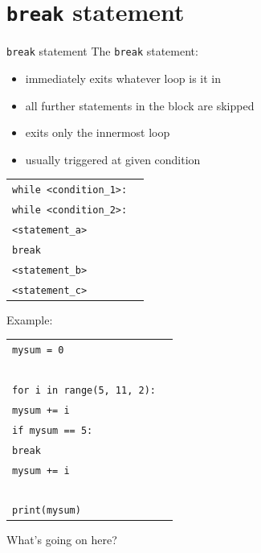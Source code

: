 \documentclass[t,handout,9pt]{beamer}
\begin{document}
\section{\texttt{break} statement}
\begin{frame}{\texttt{break} statement}
\vfill
The \texttt{break} statement:
\begin{itemize}
	\item immediately exits whatever loop is it in
	\item all further statements in the block are skipped
	\item exits only the innermost loop
	\item usually triggered at given condition
\end{itemize}
\vfill
\begin{table}[]
\begin{flushleft}
\begin{tabular}{ll}
\texttt{while <condition\_1>:} &  \\
\texttt{\qquad while <condition\_2>:} &  \\
\texttt{\qquad\qquad <statement\_a>}        & \\
\texttt{\qquad\qquad break}        & \\
\texttt{\qquad\qquad <statement\_b>}        & \\
\texttt{\qquad <statement\_c>}        & \\
\end{tabular}
\end{flushleft}
\end{table}
\vfill
\end{frame}
%
\begin{frame}
\vfill
Example:
\begin{table}[]
\begin{flushleft}
\begin{tabular}{ll}
\texttt{mysum = 0} &  \\
\texttt{ } &  \\
\texttt{for i in range(5, 11, 2):} &  \\
\texttt{\qquad mysum += i} &  \\
\texttt{\qquad if mysum == 5:}        & \\
\texttt{\qquad\qquad break}        & \\
\texttt{\qquad\qquad mysum += i} &  \\
\texttt{ } &  \\
\texttt{print(mysum)} &  \\
\end{tabular}
\end{flushleft}
\end{table}
\vfill
What's going on here?
\vfill
\end{frame}
\end{document}
